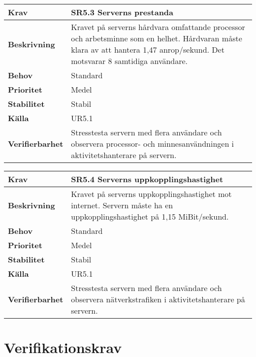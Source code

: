 \documentclass[a4paper, twoside, 11pt, titlepage]{article}
\begin{document}
\begin{tabular} { p{2.6cm} p{12.5cm} }
	\hline
	\sffamily\textbf{Krav} & \sffamily\textbf{SR5.3 Serverns prestanda } \\
	\hline
	\sffamily\textbf{Beskrivning} & Kravet på serverns hårdvara omfattande processor och arbetsminne som en helhet. Hårdvaran måste klara av att hantera 1,47 anrop/sekund. Det motsvarar 8 samtidiga användare.  \\
	\hline
	\sffamily\textbf{Behov} & Standard  \\
	\hline
	\sffamily\textbf{Prioritet} & Medel  \\
	\hline
	\sffamily\textbf{Stabilitet} & Stabil  \\
	\hline
	\sffamily\textbf{Källa} & UR5.1  \\
	\hline
	\sffamily\textbf{Verifierbarhet} & Stresstesta servern med flera användare och observera processor- och minnesanvändningen i aktivitetshanterare på servern.  \\
	\hline
\end{tabular}
\vspace{6mm}

\begin{tabular} { p{2.6cm} p{12.5cm} }
	\hline
	\sffamily\textbf{Krav} & \sffamily\textbf{SR5.4 Serverns uppkopplingshastighet } \\
	\hline
	\sffamily\textbf{Beskrivning} & Kravet på serverns uppkopplingshastighet mot internet. Servern måste ha en uppkopplingshastighet på 1,15 MiBit/sekund.  \\
	\hline
	\sffamily\textbf{Behov} & Standard  \\
	\hline
	\sffamily\textbf{Prioritet} & Medel  \\
	\hline
	\sffamily\textbf{Stabilitet} & Stabil  \\
	\hline
	\sffamily\textbf{Källa} & UR5.1  \\
	\hline
	\sffamily\textbf{Verifierbarhet} & Stresstesta servern med flera användare och observera nätverkstrafiken i aktivitetshanterare på servern.  \\
	\hline
\end{tabular}


\clearpage
\section{Verifikationskrav}
\end{document}
